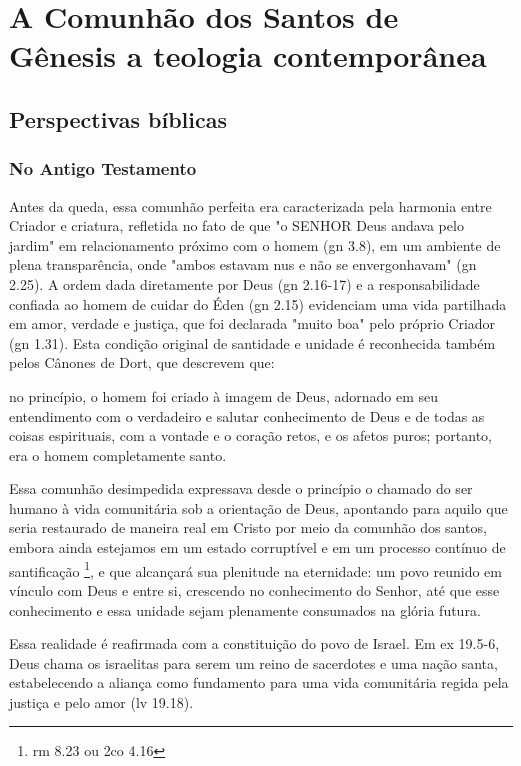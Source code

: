 \chapter{A Comunhão dos Santos de Gênesis a teologia contemporânea}

\section{Perspectivas bíblicas}

\subsection{No Antigo Testamento}

Antes da queda, essa comunhão perfeita era caracterizada pela harmonia entre Criador e criatura, refletida no fato de que "o SENHOR Deus andava pelo jardim" em relacionamento próximo com o homem (\gls{gn} 3.8), em um ambiente de plena transparência, onde "ambos estavam nus e não se envergonhavam" (\gls{gn} 2.25). A ordem dada diretamente por Deus (\gls{gn} 2.16-17) e a responsabilidade confiada ao homem de cuidar do Éden (\gls{gn} 2.15) evidenciam uma vida partilhada em amor, verdade e justiça, que foi declarada "muito boa" pelo próprio Criador (\gls{gn} 1.31). Esta condição original de santidade e unidade é reconhecida também pelos Cânones de Dort, que descrevem que:

\begin{citacao}
    no princípio, o homem foi criado à imagem de Deus, adornado em seu entendimento com o verdadeiro e salutar conhecimento de Deus e de todas as coisas espirituais, com a vontade e o coração retos, e os afetos puros; portanto, era o homem completamente santo. \cite{cdd}
\end{citacao}

Essa comunhão desimpedida expressava desde o princípio o chamado do ser humano à vida comunitária sob a orientação de Deus, apontando para aquilo que seria restaurado de maneira real em Cristo por meio da comunhão dos santos, embora ainda estejamos em um estado corruptível e em um processo contínuo de santificação \footnote{\gls{rm} 8.23 ou \gls{2co} 4.16}, e que alcançará sua plenitude na eternidade: um povo reunido em vínculo com Deus e entre si, crescendo no conhecimento do Senhor, até que esse conhecimento e essa unidade sejam plenamente consumados na glória futura.

Essa realidade é reafirmada com a constituição do povo de Israel. Em \gls{ex} 19.5-6, Deus chama os israelitas para serem um reino de sacerdotes e uma nação santa, estabelecendo a aliança como fundamento para uma vida comunitária regida pela justiça e pelo amor (\gls{lv} 19.18).

